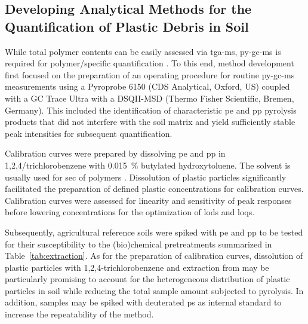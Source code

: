 \documentclass[justified,a4paper,
	nofonts,
	nobib
]{tufte-handout}
\begin{document}
\subsection{Developing Analytical Methods for the Quantification of Plastic Debris in Soil}\label{sec:methods-development}


While total polymer contents can be easily assessed via \ac{tga-ms}, \ac{py-gc-ms} is required for polymer\-/specific quantification \citep{BeckerQuantification2020}. To this end, method development first focused on the preparation of an operating procedure for routine \ac{py-gc-ms} measurements using a Pyroprobe 6150 (CDS Analytical, Oxford, US) coupled with a GC Trace Ultra with a DSQII-MSD (Thermo Fisher Scientific, Bremen, Germany). This included the identification of characteristic \ac{pe} and \ac{pp} pyrolysis products that did not interfere with the soil matrix and yield sufficiently stable peak intensities for subsequent quantification.

Calibration curves were prepared by dissolving \ac{pe} and \ac{pp} in 1,2,4\-/trichlorobenzene with \SI{0.015}{\percent} butylated hydroxytoluene. The solvent is usually used for \ac{sec} of polymers \citep{BivensPolymertoSolvent2016}. Dissolution of plastic particles significantly facilitated the preparation of defined plastic concentrations for calibration curves. Calibration curves were assessed for linearity and sensitivity of peak responses before lowering concentrations for the optimization of \acp{lod} and \acp{loq}.

Subsequently, agricultural reference soils were spiked with \ac{pe} and \ac{pp} to be tested for their susceptibility to the (bio)\-chemical pretreatments summarized in Table~\ref{tab:extraction}. As for the preparation of calibration curves, dissolution of plastic particles with 1,2,4-trichlorobenzene \citep{BivensPolymertoSolvent2016} and extraction from may be particularly promising to account for the heterogeneous distribution of plastic particles in soil while reducing the total sample amount subjected to pyrolysis. In addition, samples may be spiked with deuterated \ac{ps} as internal standard to increase the repeatability of the method.
\end{document}
